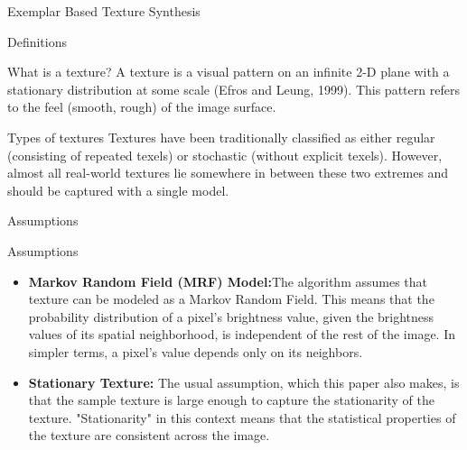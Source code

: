 \documentclass{beamer}
\begin{document}
\begin{frame}{}
    \centering
    \Huge{Exemplar Based Texture Synthesis}
\end{frame}


\begin{frame}{Definitions}
    \begin{block}{What is a texture?}
         A texture is a visual pattern on an infinite 2-D plane with a stationary distribution at some scale (Efros and Leung, 1999). This pattern refers to the feel (smooth, rough) of the image surface.   
    \end{block}

    \begin{block}{Types of textures}
         Textures have been traditionally classified as either regular (consisting of repeated texels) or stochastic (without explicit texels). However, almost all real-world textures lie somewhere in between these two extremes and should be captured with a single model.
    \end{block}
\end{frame}

\begin{frame}{Assumptions}
    
    \begin{block}{Assumptions}
    \begin{itemize}
        \item \textbf{Markov Random Field (MRF) Model:}The algorithm assumes that texture can be modeled as a Markov Random Field. This means that the probability distribution of a pixel's brightness value, given the brightness values of its spatial neighborhood, is independent of the rest of the image. In simpler terms, a pixel's value depends only on its neighbors.
        \item  \textbf{Stationary Texture:} The usual assumption, which this paper also makes, is that the sample texture is large enough to capture the stationarity of the texture. "Stationarity" in this context means that the statistical properties of the texture are consistent across the image.
    \end{itemize}
        
        
    \end{block}
\end{frame}
\end{document}
